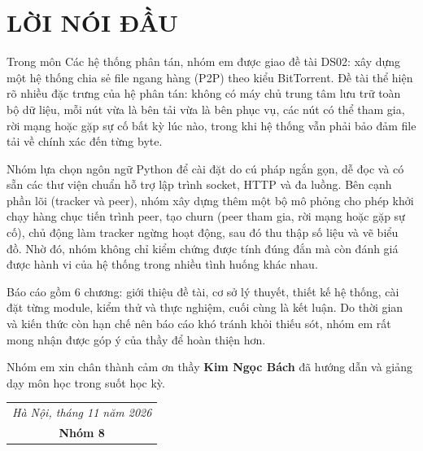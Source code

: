 \documentclass[12pt,a4paper,oneside]{report}
\begin{document}
\setcounter{page}{2}

\chapter*{LỜI NÓI ĐẦU}

Trong môn Các hệ thống phân tán, nhóm em được giao đề tài DS02: xây dựng một hệ thống chia sẻ file ngang hàng (P2P) theo kiểu BitTorrent. Đề tài thể hiện rõ nhiều đặc trưng của hệ phân tán: không có máy chủ trung tâm lưu trữ toàn bộ dữ liệu, mỗi nút vừa là bên tải vừa là bên phục vụ, các nút có thể tham gia, rời mạng hoặc gặp sự cố bất kỳ lúc nào, trong khi hệ thống vẫn phải bảo đảm file tải về chính xác đến từng byte.

Nhóm lựa chọn ngôn ngữ Python để cài đặt do cú pháp ngắn gọn, dễ đọc và có sẵn các thư viện chuẩn hỗ trợ lập trình socket, HTTP và đa luồng. Bên cạnh phần lõi (tracker và peer), nhóm xây dựng thêm một bộ mô phỏng cho phép khởi chạy hàng chục tiến trình peer, tạo churn (peer tham gia, rời mạng hoặc gặp sự cố), chủ động làm tracker ngừng hoạt động, sau đó thu thập số liệu và vẽ biểu đồ. Nhờ đó, nhóm không chỉ kiểm chứng được tính đúng đắn mà còn đánh giá được hành vi của hệ thống trong nhiều tình huống khác nhau.

Báo cáo gồm 6 chương: giới thiệu đề tài, cơ sở lý thuyết, thiết kế hệ thống, cài đặt từng module, kiểm thử và thực nghiệm, cuối cùng là kết luận. Do thời gian và kiến thức còn hạn chế nên báo cáo khó tránh khỏi thiếu sót, nhóm em rất mong nhận được góp ý của thầy để hoàn thiện hơn.

Nhóm em xin chân thành cảm ơn thầy \textbf{Kim Ngọc Bách} đã hướng dẫn và giảng dạy môn học trong suốt học kỳ.

\vspace{1cm}
\hfill\begin{tabular}{c}\textit{Hà Nội, tháng 11 năm 2026}\\ \textbf{Nhóm 8}\end{tabular}

\tableofcontents
\listoffigures
\listoftables
\end{document}
